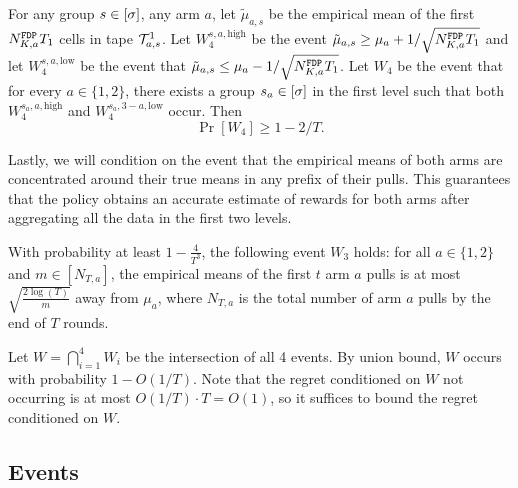 \begin{lemma}\label{3levelw4}
  For any group $s\in [\sigma]$, any arm $a$, let $\tilde\mu_{a,s}$ be the
  empirical mean of the first $N^\mathtt{FDP}_{K,a}  T_1$ cells in tape $\mathcal{T}^1_{a, s}$.
  Let $W_4^{s,a,\text{high}}$ be the event
  $\tilde\mu_{a, s} \geq \mu_a + 1/\sqrt{N^\mathtt{FDP}_{K,a}  T_1}$ and let
  $W_4^{s,a,\text{low}}$ be the event that
  $\tilde\mu_{a, s} \leq \mu_a - 1/\sqrt{N^\mathtt{FDP}_{K,a}  T_1}$.  Let $W_4$ be the
  event that for every $a\in \{1, 2\}$, there exists a group
  $s_a\in [\sigma]$ in the first level such that both $W_4^{s_a,a,\text{high}}$
  and $W_4^{s_a,3-a,\text{low}}$ occur. Then
  \[
    \Pr[W_4]\geq 1 -2 /T.
  \]
\end{lemma}




Lastly, we will condition on the event that the empirical means of
both arms are concentrated around their true means in any prefix of
their pulls. This guarantees that the policy obtains an accurate
estimate of rewards for both arms after aggregating all the data in
the first two levels.


 

\begin{lemma}\label{3levelw3}
  With probability at least $1 - \frac{4}{T^3}$, the following event
  $W_3$ holds: for all $a\in \{1, 2\}$ and $m \in [N_{T, a}]$, the
  empirical means of the first $t$  arm $a$ pulls is at most
  $\sqrt{\frac{2\log(T)}{m}}$ away from $\mu_a$, where $N_{T, a}$ is
  the total number of arm $a$ pulls by the end of $T$ rounds.
\end{lemma}




Let $W = \bigcap_{i=1}^4 W_i$ be the intersection of all 4
events.  By union bound, $W$ occurs with probability $1-O(1/T)$. Note
that the regret conditioned on $W$ not occurring is at most
$O(1/T) \cdot T = O(1)$, so it suffices to bound the regret conditioned on $W$.



\subsection{Events}


